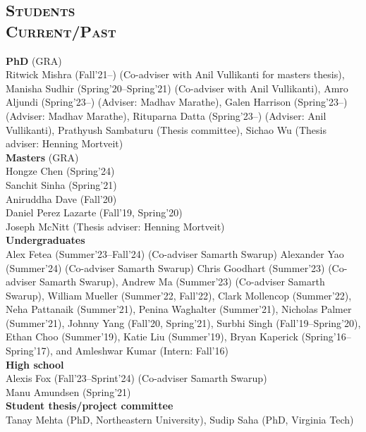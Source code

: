 \documentclass[margin,10pt]{res} %
\begin{document}
\begin{resume}
{\section{\textnormal{\textsc{Students \\Current/Past}}}
\noindent\textbf{PhD} (GRA)\\
Ritwick Mishra (Fall'21--) (Co-adviser with Anil
Vullikanti for masters thesis),
Manisha Sudhir (Spring'20--Spring'21) (Co-adviser with Anil
Vullikanti),
Amro Aljundi (Spring'23--) (Adviser: Madhav Marathe),
Galen Harrison (Spring'23--) (Adviser: Madhav Marathe),
Rituparna Datta (Spring'23--) (Adviser: Anil Vullikanti),
Prathyush Sambaturu (Thesis committee),
Sichao Wu (Thesis adviser: Henning Mortveit)\vspace{.2cm}\\
\noindent\textbf{Masters} (GRA)\\
Hongze Chen (Spring'24)\\
Sanchit Sinha (Spring'21)\\
Aniruddha Dave (Fall'20)\\
Daniel Perez Lazarte (Fall'19, Spring'20)\\
Joseph McNitt (Thesis adviser: Henning Mortveit)\vspace{.2cm}\\
\noindent\textbf{Undergraduates}\\
Alex Fetea (Summer'23--Fall'24) (Co-adviser Samarth Swarup)
Alexander Yao (Summer'24) (Co-adviser Samarth Swarup)
Chris Goodhart (Summer'23) (Co-adviser Samarth Swarup),
Andrew Ma (Summer'23) (Co-adviser Samarth Swarup),
William Mueller (Summer'22, Fall'22),
Clark Mollencop (Summer'22),
Neha Pattanaik (Summer'21),
Penina Waghalter (Summer'21),
Nicholas Palmer (Summer'21),
Johnny Yang (Fall'20, Spring'21),
Surbhi Singh (Fall'19--Spring'20),
Ethan Choo (Summer'19),
Katie Liu (Summer'19),
Bryan Kaperick (Spring'16--Spring'17), and
Amleshwar Kumar (Intern: Fall'16) \vspace{.2cm}\\
\noindent\textbf{High school}\\
Alexis Fox (Fall'23--Sprint'24) (Co-adviser Samarth Swarup) \\
Manu Amundsen (Spring'21)\vspace{.2cm}\\
\noindent\textbf{Student thesis/project committee}\\
Tanay Mehta (PhD, Northeastern University),
Sudip Saha (PhD, Virginia Tech)
}
\end{resume}
\end{document}
